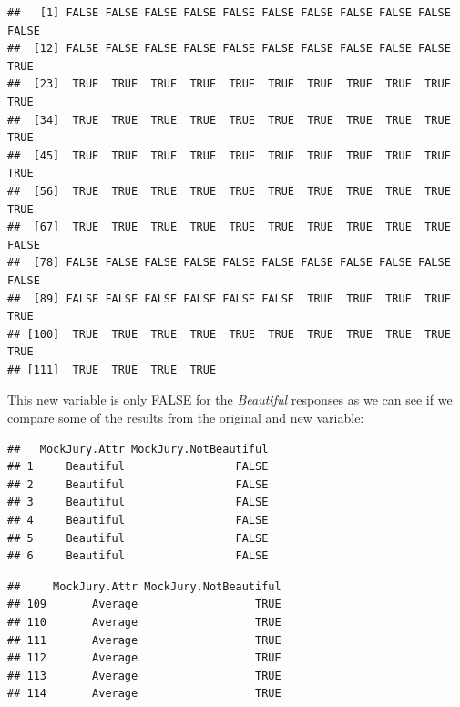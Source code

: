 \documentclass[]{book}
\newenvironment{Shaded}{\begin{snugshade}}{\end{snugshade}}
\newcommand{\KeywordTok}[1]{\textcolor[rgb]{0.13,0.29,0.53}{\textbf{#1}}}
\newcommand{\OperatorTok}[1]{\textcolor[rgb]{0.81,0.36,0.00}{\textbf{#1}}}
\newcommand{\NormalTok}[1]{#1}
\begin{document}
\begin{verbatim}
##   [1] FALSE FALSE FALSE FALSE FALSE FALSE FALSE FALSE FALSE FALSE FALSE
##  [12] FALSE FALSE FALSE FALSE FALSE FALSE FALSE FALSE FALSE FALSE  TRUE
##  [23]  TRUE  TRUE  TRUE  TRUE  TRUE  TRUE  TRUE  TRUE  TRUE  TRUE  TRUE
##  [34]  TRUE  TRUE  TRUE  TRUE  TRUE  TRUE  TRUE  TRUE  TRUE  TRUE  TRUE
##  [45]  TRUE  TRUE  TRUE  TRUE  TRUE  TRUE  TRUE  TRUE  TRUE  TRUE  TRUE
##  [56]  TRUE  TRUE  TRUE  TRUE  TRUE  TRUE  TRUE  TRUE  TRUE  TRUE  TRUE
##  [67]  TRUE  TRUE  TRUE  TRUE  TRUE  TRUE  TRUE  TRUE  TRUE  TRUE FALSE
##  [78] FALSE FALSE FALSE FALSE FALSE FALSE FALSE FALSE FALSE FALSE FALSE
##  [89] FALSE FALSE FALSE FALSE FALSE FALSE  TRUE  TRUE  TRUE  TRUE  TRUE
## [100]  TRUE  TRUE  TRUE  TRUE  TRUE  TRUE  TRUE  TRUE  TRUE  TRUE  TRUE
## [111]  TRUE  TRUE  TRUE  TRUE
\end{verbatim}

This new variable is only FALSE for the \emph{Beautiful} responses as we
can see if we compare some of the results from the original and new
variable:

\begin{Shaded}
\end{Shaded}

\begin{verbatim}
##   MockJury.Attr MockJury.NotBeautiful
## 1     Beautiful                 FALSE
## 2     Beautiful                 FALSE
## 3     Beautiful                 FALSE
## 4     Beautiful                 FALSE
## 5     Beautiful                 FALSE
## 6     Beautiful                 FALSE
\end{verbatim}

\begin{Shaded}
\end{Shaded}

\begin{verbatim}
##     MockJury.Attr MockJury.NotBeautiful
## 109       Average                  TRUE
## 110       Average                  TRUE
## 111       Average                  TRUE
## 112       Average                  TRUE
## 113       Average                  TRUE
## 114       Average                  TRUE
\end{verbatim}
\end{document}
